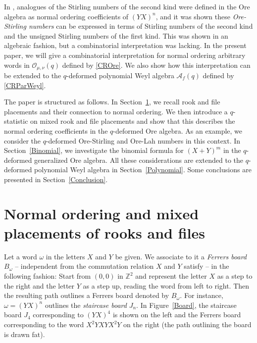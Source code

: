 \documentclass[10pt]{amsart}
\begin{document}
In \cite{TMMS2023}, analogues of the Stirling numbers of the second kind were defined in the Ore algebra as normal ordering coefficients of $(YX)^n$, and it was shown these {\em Ore-Stirling numbers} can be expressed in terms of Stirling numbers of the second kind and the unsigned Stirling numbers of the first kind. This was shown in an algebraic fashion, but a combinatorial interpretation was lacking. In the present paper, we will give a combinatorial interpretation for normal ordering arbitrary words in ${\mathcal O}_{\mu,\nu}(q)$ defined by \eqref{CROre}. We also show how this interpretation can be extended to the  $q$-deformed polynomial Weyl algebra $\mathcal{A}_{f}(q)$ defined by \eqref{CRParWeyl}. 

The paper is structured as follows. In Section~\ref{Normal}, we recall rook and file placements and their connection to normal ordering. We then introduce a $q$-statistic on mixed rook and file placements and show that this describes the normal ordering coefficients in the $q$-deformed Ore algebra. As an example, we consider the $q$-deformed Ore-Stirling and Ore-Lah numbers in this context. In Section~\ref{Binomial}, we investigate the binomial formula for $(X+Y)^m$ in the $q$-deformed generalized Ore algebra. All these considerations are extended to the $q$-deformed polynomial Weyl algebra in Section~\ref{Polynomial}. Some conclusions are presented in Section~\ref{Conclusion}.

\section{Normal ordering and mixed placements of rooks and files}\label{Normal}
Let a word $\omega$ in the letters $X$ and $Y$ be given. We associate to it a {\em Ferrers board} $B_{\omega}$ -- independent from the commutation relation $X$ and $Y$ satisfy -- in the following fashion: Start from $(0, 0)$ in $\mathbb{Z}^2$ and represent the letter $X$ as a step to the right and the letter $Y$ as a step up, reading the word from left to right. Then the resulting path outlines a Ferrers board denoted by $B_{\omega}$. For instance, $\omega=(YX)^n$ outlines the {\em staircase board} $J_n$. In Figure~\ref{Board}, the staircase board $J_4$ corresponding to $(YX)^4$ is shown on the left and the Ferrers board corresponding to the word $X^2YXYX^2Y$ on the right (the path outlining the board is drawn fat).
\end{document}
